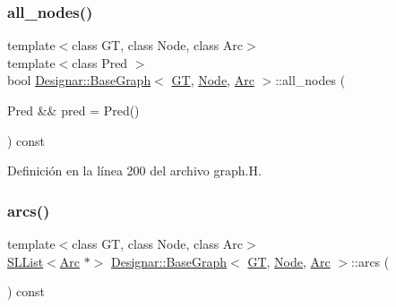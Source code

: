 \subsubsection{\texorpdfstring{all\+\_\+nodes()}{all\_nodes()}\hspace{0.1cm}{\footnotesize\ttfamily [2/2]}}
{\footnotesize\ttfamily template$<$class GT, class Node, class Arc$>$ \\
template$<$class Pred $>$ \\
bool \hyperlink{class_designar_1_1_base_graph}{Designar\+::\+Base\+Graph}$<$ \hyperlink{demo-buildgraph_8_c_a3001c40d2c31ca87ed96cd7d1334a55e}{GT}, \hyperlink{namespace_designar_a5af326c65aa2bd26b26c410f2030d09e}{Node}, \hyperlink{namespace_designar_a3f55fb5513d62ff47cbc8f72b8e95d6f}{Arc} $>$\+::all\+\_\+nodes (\begin{DoxyParamCaption}\item[{Pred \&\&}]{pred = {\ttfamily Pred()} }\end{DoxyParamCaption}) const\hspace{0.3cm}{\ttfamily [inline]}}



Definición en la línea 200 del archivo graph.\+H.

\mbox{\label{class_designar_1_1_base_graph_af9d306a0474e8e3b38b7bd697b844d11}} 
\subsubsection{\texorpdfstring{arcs()}{arcs()}}
{\footnotesize\ttfamily template$<$class GT, class Node, class Arc$>$ \\
\hyperlink{class_designar_1_1_s_l_list}{S\+L\+List}$<$\hyperlink{namespace_designar_a3f55fb5513d62ff47cbc8f72b8e95d6f}{Arc} $\ast$$>$ \hyperlink{class_designar_1_1_base_graph}{Designar\+::\+Base\+Graph}$<$ \hyperlink{demo-buildgraph_8_c_a3001c40d2c31ca87ed96cd7d1334a55e}{GT}, \hyperlink{namespace_designar_a5af326c65aa2bd26b26c410f2030d09e}{Node}, \hyperlink{namespace_designar_a3f55fb5513d62ff47cbc8f72b8e95d6f}{Arc} $>$\+::arcs (\begin{DoxyParamCaption}{ }\end{DoxyParamCaption}) const\hspace{0.3cm}{\ttfamily [inline]}}



